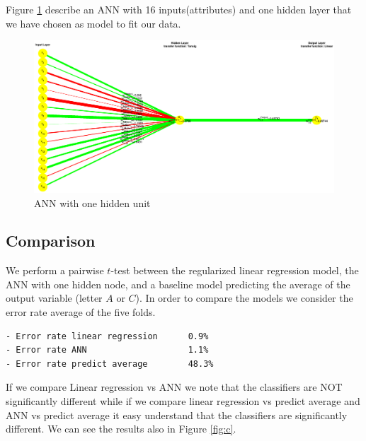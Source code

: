 Figure \ref{fig:n1} describe an ANN with 16 inputs(attributes) and one hidden layer that we have chosen as model to fit our data.
\begin{figure}[htbp]
\center
\includegraphics[width = 1.0\textwidth]{figures/n1}
\caption{ANN with one hidden unit}
\label{fig:n1}
\end{figure}


\subsection{Comparison}
We perform a pairwise $t$-test between the regularized linear regression model, the ANN with one hidden node, and a baseline model predicting the average of the output variable (letter $A$ or $C$). In order to compare the models we consider the error rate average of the five folds. 
\begin{verbatim}
- Error rate linear regression      0.9%
- Error rate ANN                    1.1%
- Error rate predict average        48.3%
\end{verbatim}
If we compare Linear regression vs ANN we note that the classifiers are NOT significantly different while if we compare linear regression vs predict average and ANN vs predict average it easy understand that the classifiers are significantly different. We can see the results also in Figure \ref{fig:c}.

